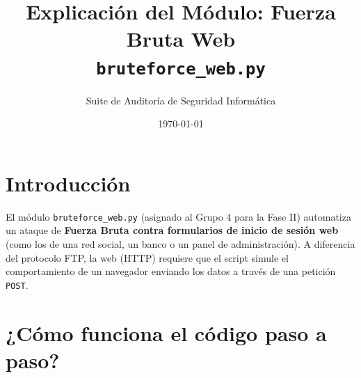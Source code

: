 \documentclass[12pt,a4paper]{article}
\title{\textbf{Explicación del Módulo: Fuerza Bruta Web}\\ \large \texttt{bruteforce\_web.py}}
\author{Suite de Auditoría de Seguridad Informática}
\date{\today}
\begin{document}
\maketitle

\section*{Introducción}
El módulo \texttt{bruteforce\_web.py} (asignado al Grupo 4 para la Fase II) automatiza un ataque de \textbf{Fuerza Bruta contra formularios de inicio de sesión web} (como los de una red social, un banco o un panel de administración). A diferencia del protocolo FTP, la web (HTTP) requiere que el script simule el comportamiento de un navegador enviando los datos a través de una petición \texttt{POST}.

\section*{¿Cómo funciona el código paso a paso?}
\end{document}
